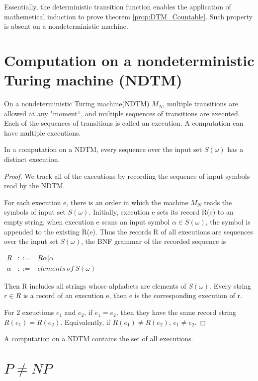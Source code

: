 \documentclass[final,leqno]{siamltex}
\begin{document}
Essentially, the deterministic transition function enables the application of mathemetical induction to prove theorem \ref{prop:DTM_Countable}. Such property is absent on a nondeterministic machine.

\section{Computation on a nondeterministic Turing machine (NDTM)}
On a nondeterministic Turing machine(NDTM) $M_N$, multiple transitions are allowed at any "moment``, and multiple sequences of transitions are executed. Each of the sequences of transitions is called an execution. A computation can have multiple executions.

\begin{proposition} 
\label{prop:NDTM_uncountable}
In a computation on a NDTM, every sequence over the input set $S(\omega)$ has a distinct execution.
\end{proposition}

\begin{proof}
We track all of the executions by recording the sequence of input symbols read by the NDTM.

For each execution e, there is an order in which the machine $M_N$ reads the symbols of input set $S(\omega)$. Initially, execution e sets its record R(e) to an empty string, when execution e scans an input symbol $\alpha\in S(\omega)$, the symbol is appended to the existing R(e). Thus the records R of all executions are sequences over the input set $S(\omega)$, the BNF grammar of the recorded sequence is

$\begin{array}{ccc}
R&::=&R\alpha|\alpha\\
\alpha&::=&elements~ of~ S(\omega)
\end{array}
$

Then R includes all strings whose alphabets are elements of $S(\omega)$. Every string $r\in R$ is a record of an execution e, then e is the corresponding execution of r.

For 2 exeuctions $e_1$ and $e_2$, if $e_1= e_2$, then they have the same record string $R(e_1)= R(e_2)$. Equivalently, if $R(e_1)\neq R(e_2)$, $e_1\neq e_2$.

\end{proof}

A computation on a NDTM contains the set of all executions.

\section{$P\neq NP$}
\end{document}
